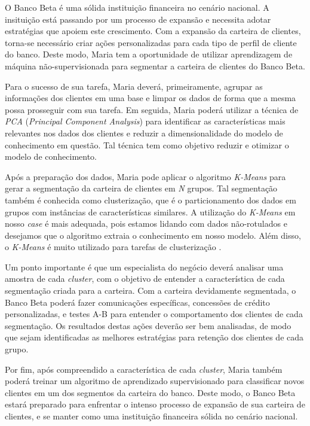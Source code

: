 O Banco Beta é uma sólida instituição financeira no cenário nacional. A insituição está passando por um processo de expansão e necessita adotar estratégias que apoiem este crescimento. Com a expansão da carteira de clientes, torna-se necessário criar ações personalizadas para cada tipo de perfil de cliente do banco. Deste modo, Maria tem a oportunidade de utilizar aprendizagem de máquina não-supervisionada \cite{barlow1989unsupervised} para segmentar a carteira de clientes do Banco Beta.

Para o sucesso de sua tarefa, Maria deverá, primeiramente, agrupar as informações dos clientes em uma base e limpar os dados de forma que a mesma possa prosseguir com sua tarefa. Em seguida, Maria poderá utilizar a técnica de \textit{PCA} (\textit{Principal Component Analysis}) \cite{mackiewicz1993principal} para identificar as características mais relevantes nos dados dos clientes e reduzir a dimensionalidade do modelo de conhecimento em questão. Tal técnica tem como objetivo reduzir e otimizar o modelo de conhecimento.

Após a preparação dos dados, Maria pode aplicar o algoritmo \textit{K-Means} \cite{hamerly2004learning} para gerar a segmentação da carteira de clientes em \textit{N} grupos. Tal segmentação também é conhecida como clusterização, que é o particionamento dos dados em grupos com instâncias de características similares. A utilização do \textit{K-Means} em nosso \textit{case} é mais adequada, pois estamos lidando com dados não-rotulados e desejamos que o algoritmo extraia o conhecimento em nosso modelo. Além disso, o \textit{K-Means} é muito utilizado para tarefas de clusterização \cite{burkardt2009k}.

Um ponto importante é que um especialista do negócio deverá analisar uma amostra de cada \textit{cluster}, com o objetivo de entender a característica de cada segmentação criada para a carteira. Com a carteira devidamente segmentada, o Banco Beta poderá fazer comunicações específicas, concessões de crédito personalizadas, e testes A-B para entender o comportamento dos clientes de cada segmentação. Os resultados destas ações deverão ser bem analisadas, de modo que sejam identificadas as melhores estratégias para retenção dos clientes de cada grupo.

Por fim, após compreendido a característica de cada \textit{cluster}, Maria também poderá treinar um algoritmo de aprendizado supervisionado para classificar novos clientes em um dos segmentos da carteira do banco. Deste modo, o Banco Beta estará preparado para enfrentar o intenso processo de expansão de sua carteira de clientes, e se manter como uma instituição financeira sólida no cenário nacional.
